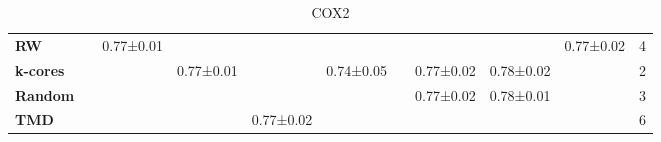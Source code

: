 \begin{table}[H]
\begin{subtable}{\textwidth}
{\begin{tabular}{l|c|c|c|c|c|c|c|c|c|c}
\hline
\textbf{RW}
    & \cellcolor{green!25}{0.78±0.01}
    & 0.77±0.01
    & \cellcolor{green!80}{0.79±0.01}
    & \cellcolor{green!80}{0.80±0.02}
    & \cellcolor{green!80}{0.79±0.02}
    & \cellcolor{green!80}{0.78±0.02}
    & \cellcolor{green!25}{0.79±0.02}
    & \cellcolor{green!25}{0.79±0.02}
    & 0.77±0.02
    & 4 \\
\textbf{k-cores}
    & \cellcolor{green!25}{0.78±0.01}
    & \cellcolor{green!25}{0.78±0.02}
    & 0.77±0.01
    & \cellcolor{green!25}{0.79±0.02}
    & 0.74±0.05
    & \cellcolor{green!80}{0.78±0.01}
    & 0.77±0.02
    & 0.78±0.02
    & \cellcolor{green!80}{0.79±0.02}
    & 2 \\
\textbf{Random}
    & \cellcolor{green!80}{0.79±0.02}
    & \cellcolor{green!25}{0.78±0.02}
    & \cellcolor{green!25}{0.78±0.01}
    & \cellcolor{green!25}{0.79±0.02}
    & \cellcolor{green!80}{0.79±0.01}
    & \cellcolor{green!80}{0.78±0.02}
    & 0.77±0.02
    & 0.78±0.01
    & \cellcolor{green!25}{0.78±0.01}
    & 3 \\
\textbf{TMD}
    & \cellcolor{green!80}{0.79±0.02}
    & \cellcolor{green!80}{0.79±0.02}
    & \cellcolor{green!25}{0.78±0.01}
    & 0.77±0.02
    & \cellcolor{green!25}{0.78±0.01}
    & \cellcolor{green!80}{0.78±0.02}
    & \cellcolor{green!80}{0.80±0.02}
    & \cellcolor{green!80}{0.80±0.01}
    & \cellcolor{green!80}{0.79±0.02}
    & 6 \\
\hline
\end{tabular}
}
\caption{COX2}
\label{tab:cox2-pivot}
\end{subtable}

\end{table}